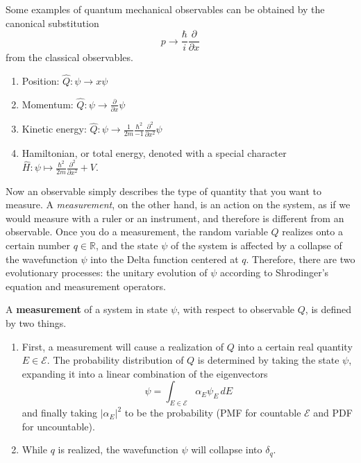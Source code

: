\documentclass{article}
\begin{document}
  \begin{example}
    \label{ex:quantum-observables-by-canonical-substitution}
 
    Some examples of quantum mechanical observables can be obtained by the canonical substitution 
    \begin{equation} 
      p \rightarrow \frac{\hbar}{i} \frac{\partial}{\partial x} 
    \end{equation}
    from the classical observables. 
      \begin{enumerate} 
        \item Position: $\hat{Q}: \psi \rightarrow x \psi$ 
        \item Momentum: $\hat{Q}: \psi \rightarrow \frac{\partial}{\partial x} \psi $ 
        \item Kinetic energy: $\hat{Q}: \psi \rightarrow \frac{1}{2m} \frac{\hbar^2}{-1} \frac{\partial^2}{\partial x^2} \psi$

        \item Hamiltonian, or total energy, denoted with a special character $\hat{H} : \psi \mapsto \frac{\hbar^2}{2m} \frac{\partial^2}{\partial x^2} + V$. 
      \end{enumerate} 
  \end{example}

  Now an observable simply describes the type of quantity that you want to measure. A \textit{measurement}, on the other hand, is an action on the system, as if we would measure with a ruler or an instrument, and therefore is different from an observable. Once you do a measurement, the random variable $Q$ realizes onto a certain number $q \in \mathbb{R}$, and the state $\psi$ of the system is affected by a collapse of the wavefunction $\psi$ into the Delta function centered at $q$. Therefore, there are two evolutionary processes: the unitary evolution of $\psi$ according to Shrodinger's equation and measurement operators. 

  \begin{definition}[Measurement]
    \label{def:measurement}
    A \textbf{measurement} of a system in state $\psi$, with respect to observable $Q$, is defined by two things. 
    \begin{enumerate} 
      \item First, a measurement will cause a realization of $Q$ into a certain real quantity $E \in \mathcal{E}$. The probability distribution of $Q$ is determined by taking the state $\psi$, expanding it into a linear combination of the eigenvectors 
      \begin{equation} 
        \psi = \int_{E \in \mathcal{E}}  \alpha_E \psi_E \,dE
      \end{equation}
      and finally taking $|\alpha_E|^2$ to be the probability (PMF for countable $\mathcal{E}$ and PDF for uncountable).  

      \item While $q$ is realized, the wavefunction $\psi$ will collapse into $\delta_q$. 
    \end{enumerate}
  \end{definition}
\end{document}
